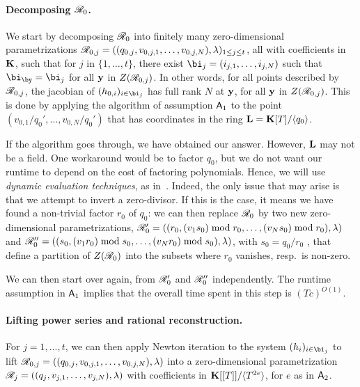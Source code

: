 \documentclass[12pt]{article}
\begin{document}
\paragraph{Decomposing $\mathscr{R}_0$.}
We start by decomposing $\mathscr{R}_0$ into finitely many zero-dimensional
parametrizations
$\mathscr{R}_{0,j}=((q_{0,j},v_{0,j,1},\dots,v_{0,j,N}),\lambda)_{1\le j\le
  t}$, all with coefficients in $\mathbf{K}$, such that for $j$ in
$\{1,\dots,t\}$, there exist $\bi_j=(i_{j,1},\dots,i_{j,N})$ such that
$\bi_\by=\bi_j$ for all $\mathbf{y}$ in $Z(\mathscr{R}_{0,j})$. In other words, for
all points described by $\mathscr{R}_{0,j}$, the jacobian of $(h_{0,i})_{i
  \in \bi_j}$ has full rank $N$ at $\mathbf{y}$, for all $\mathbf{y}$ in
$Z(\mathscr{R}_{0,j})$. This is done by applying the algorithm of assumption
${\sf A}_1$ to the point $(v_{0,1}/q_0',\dots,v_{0,N}/q_0')$ that has
coordinates in the ring $\mathbf{L}=\mathbf{K}[T]/\langle q_0 \rangle$.

If the algorithm goes through, we have obtained our answer. However,
$\mathbf{L}$ may not be a field.  One workaround would be to factor $q_0$,
but we do not want our runtime to depend on the cost of factoring
polynomials. Hence, we will use {\em dynamic evaluation techniques},
as in~\cite{D5}. Indeed, the only issue that may arise is that we
attempt to invert a zero-divisor. If this is the case, it means we
have found a non-trivial factor $r_0$ of $q_0$: we can then replace
$\mathscr{R}_0$ by two new zero-dimensional parametrizations,
$\mathscr{R}'_0=((r_0,(v_1 s_0) \bmod r_0,\dots,(v_N s_0)\bmod
r_0),\lambda)$ and $\mathscr{R}''_0=((s_0,(v_1 r_0) \bmod s_0,\dots,(v_N
r_0)\bmod s_0),\lambda)$, with $s_0=q_0/r_0$ , that define a partition of $Z(\mathscr{R}_0)$ into the
subsets where $r_0$ vanishes, resp.\ is non-zero. 

We can then start over again, from $\mathscr{R}'_0$ and $\mathscr{R}''_0$
independently. The runtime assumption in ${\sf A}_1$ implies that the
overall time spent in this step is $(T c)^{O(1)}$.

\paragraph{Lifting power series and rational reconstruction.}
For $j=1,\dots,t$, we can then apply Newton iteration to the system
$(h_i)_{i \in \bi_j}$ to lift
$\mathscr{R}_{0,j}=((q_{0,j},v_{0,j,1},\dots,v_{0,j,N}),\lambda)$ into a
zero-dimensional parametrization
$\mathscr{R}_{j}=((q_{j},v_{j,1},\dots,v_{j,N}),\lambda)$ with coefficients
in $\mathbf{K}[[T]]/\langle T^{2e}\rangle$, for $e$ as in ${\sf A}_2$.
\end{document}

